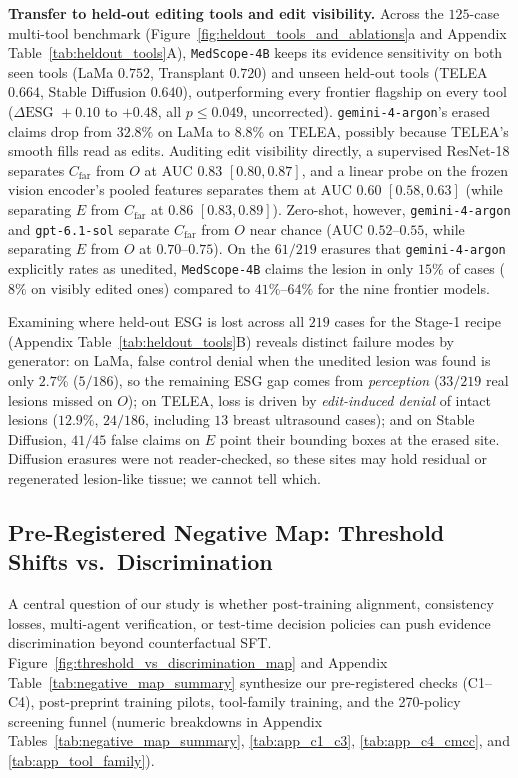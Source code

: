 \documentclass[5p,times,twocolumn,authoryear]{elsarticle}
\begin{document}
\textbf{Transfer to held-out editing tools and edit visibility.} Across the $125$-case multi-tool benchmark (Figure~\ref{fig:heldout_tools_and_ablations}a and Appendix Table~\ref{tab:heldout_tools}A), \texttt{MedScope-4B} keeps its evidence sensitivity on both seen tools (LaMa $0.752$, Transplant $0.720$) and unseen held-out tools (TELEA $0.664$, Stable Diffusion $0.640$), outperforming every frontier flagship on every tool ($\Delta\text{ESG } +0.10$ to $+0.48$, all $p \le 0.049$, uncorrected). \texttt{gemini-4-argon}'s erased claims drop from $32.8\%$ on LaMa to $8.8\%$ on TELEA, possibly because TELEA's smooth fills read as edits. Auditing edit visibility directly, a supervised ResNet-18 separates $C_{\text{far}}$ from $O$ at $\text{AUC } 0.83$ $[0.80, 0.87]$, and a linear probe on the frozen vision encoder's pooled features separates them at $\text{AUC } 0.60$ $[0.58, 0.63]$ (while separating $E$ from $C_{\text{far}}$ at $0.86$ $[0.83, 0.89]$). Zero-shot, however, \texttt{gemini-4-argon} and \texttt{gpt-6.1-sol} separate $C_{\text{far}}$ from $O$ near chance ($\text{AUC } 0.52\text{--}0.55$, while separating $E$ from $O$ at $0.70\text{--}0.75$). On the $61/219$ erasures that \texttt{gemini-4-argon} explicitly rates as unedited, \texttt{MedScope-4B} claims the lesion in only $15\%$ of cases ($8\%$ on visibly edited ones) compared to $41\%\text{--}64\%$ for the nine frontier models.

Examining where held-out ESG is lost across all $219$ cases for the Stage-1 recipe (Appendix Table~\ref{tab:heldout_tools}B) reveals distinct failure modes by generator: on LaMa, false control denial when the unedited lesion was found is only $2.7\%$ ($5/186$), so the remaining ESG gap comes from \emph{perception} ($33/219$ real lesions missed on $O$); on TELEA, loss is driven by \emph{edit-induced denial} of intact lesions ($12.9\%$, $24/186$, including $13$ breast ultrasound cases); and on Stable Diffusion, $41/45$ false claims on $E$ point their bounding boxes at the erased site. Diffusion erasures were not reader-checked, so these sites may hold residual or regenerated lesion-like tissue; we cannot tell which.

\subsection{Pre-Registered Negative Map: Threshold Shifts vs.\ Discrimination}
\label{subsec:exp_negative_map}
A central question of our study is whether post-training alignment, consistency losses, multi-agent verification, or test-time decision policies can push evidence discrimination beyond counterfactual SFT. Figure~\ref{fig:threshold_vs_discrimination_map} and Appendix Table~\ref{tab:negative_map_summary} synthesize our pre-registered checks (C1--C4), post-preprint training pilots, tool-family training, and the 270-policy screening funnel (numeric breakdowns in Appendix Tables~\ref{tab:negative_map_summary}, \ref{tab:app_c1_c3}, \ref{tab:app_c4_cmcc}, and \ref{tab:app_tool_family}).
\end{document}
